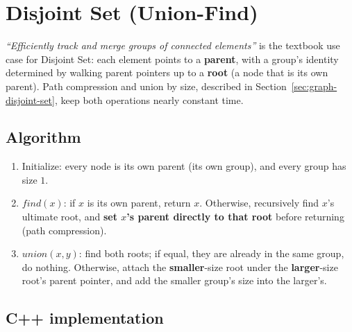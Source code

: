 \section{Disjoint Set (Union-Find)}
\label{sec:graph-disjoint-set-impl}


\begin{patternbox}
\emph{``Efficiently track and merge groups of connected elements''} is
the textbook use case for Disjoint Set: each element points to a
\textbf{parent}, with a group's identity determined by walking parent
pointers up to a \textbf{root} (a node that is its own parent).
Path compression and union by size, described in
Section~\ref{sec:graph-disjoint-set}, keep both operations nearly
constant time.
\end{patternbox}

\subsection*{Algorithm}

\begin{enumerate}
  \item Initialize: every node is its own parent (its own group), and
        every group has size $1$.
  \item $\textit{find}(x)$: if $x$ is its own parent, return $x$.
        Otherwise, recursively find $x$'s ultimate root, and
        \textbf{set $x$'s parent directly to that root} before
        returning (path compression).
  \item $\textit{union}(x,y)$: find both roots; if equal, they are
        already in the same group, do nothing. Otherwise, attach the
        \textbf{smaller}-size root under the \textbf{larger}-size
        root's parent pointer, and add the smaller group's size into
        the larger's.
\end{enumerate}

\subsection*{C++ implementation}

